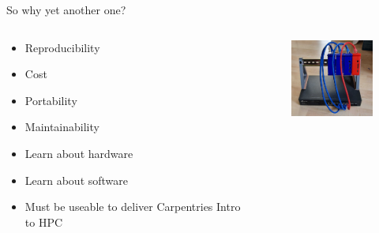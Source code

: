 \begin{frame}{So why yet another one?}
	\begin{columns}
		\begin{column}{0.5\linewidth}
			\begin{itemize}[label={$\color{UmUBlue}\bullet$}]
				\item Reproducibility
				\item Cost
				\item Portability
				\item Maintainability
				\item Learn about hardware
				\item Learn about software
				\item Must be useable to deliver Carpentries Intro to HPC
			\end{itemize}
		\end{column}
		\begin{column}{0.5\linewidth}
			\begin{figure}
				\includegraphics[width=3.5cm]{graphics/rockpi.jpg}
			\end{figure}
		\end{column}
	\end{columns}
\end{frame}
